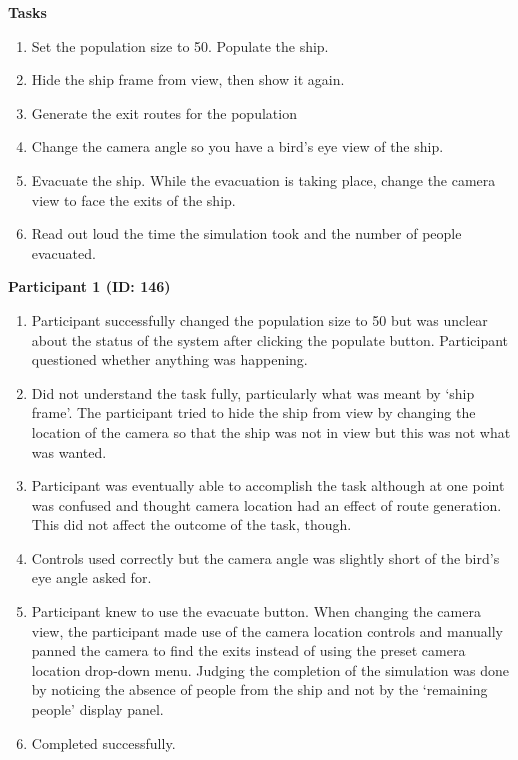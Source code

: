 
\textbf{Tasks}
\begin{enumerate}
\item Set the population size to 50. Populate the ship.
\item Hide the ship frame from view, then show it again.
\item Generate the exit routes for the population
\item Change the camera angle so you have a bird’s eye view of the ship.
\item Evacuate the ship. While the evacuation is taking place, change the camera view to face the exits of the ship.
\item Read out loud the time the simulation took and the number of people evacuated.
\end{enumerate}

\textbf{Participant 1 (ID: 146)}
\begin{enumerate}
\item Participant successfully changed the population size to 50 but was unclear about the status of the system after clicking the populate button. Participant questioned whether anything was happening.
\item Did not understand the task fully, particularly what was meant by ‘ship frame’. The participant tried to hide the ship from view by changing the location of the camera so that the ship was not in view but this was not what was wanted.
\item Participant was eventually able to accomplish the task although at one point was confused and thought camera location had an effect of route generation. This did not affect the outcome of the task, though.
\item Controls used correctly but the camera angle was slightly short of the bird’s eye angle asked for.
\item Participant knew to use the evacuate button. When changing the camera view, the participant made use of the camera location controls and manually panned the camera to find the exits instead of using the preset camera location drop-down menu. Judging the completion of the simulation was done by noticing the absence of people from the ship and not by the ‘remaining people’ display panel.
\item Completed successfully.
\end{enumerate}

